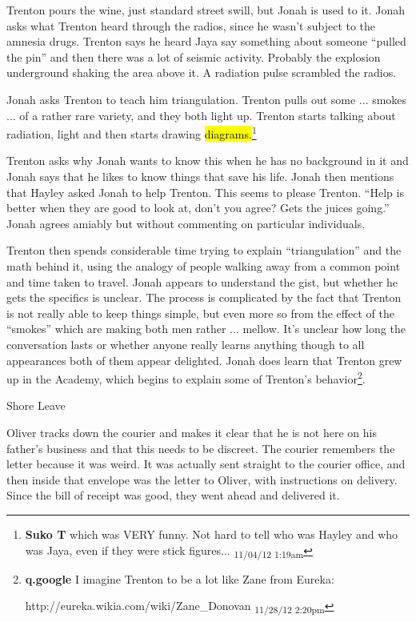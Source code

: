 Trenton pours the wine, just standard street swill, but Jonah is used to it.  Jonah asks what Trenton heard through the radios, since he wasn't subject to the amnesia drugs.  Trenton says he heard Jaya say something about someone ``pulled the pin'' and then there was a lot of seismic activity. Probably the explosion underground shaking the area above it.  A radiation pulse scrambled the radios.



Jonah asks Trenton to teach him triangulation. Trenton pulls out some ... smokes ... of a rather rare variety, and they both light up.  Trenton starts talking about radiation, light and then starts drawing \hl{diagrams.}\footnote{\textbf{Suko T }which was VERY funny.  Not hard to tell who was Hayley and who was Jaya, even if they were stick figures... \textsubscript{11/04/12 1:19am}}



Trenton asks why Jonah wants to know this when he has no background in it and Jonah says that he likes to know things that save his life.  Jonah then mentions that Hayley asked Jonah to help Trenton.  This seems to please Trenton.  ``Help is better when they are good to look at, don't you agree?  Gets the juices going.''  Jonah agrees amiably but without commenting on particular individuals.



Trenton then spends considerable time trying to explain ``triangulation'' and the math behind it, using the analogy of people walking away from a common point and time taken to travel.  Jonah appears to understand the gist, but whether he gets the specifics is unclear.  The process is complicated by the fact that Trenton is not really able to keep things simple, but even more so from the effect of the ``smokes'' which are making both men rather ... mellow.  It's unclear how long the conversation lasts or whether anyone really learns anything though to all appearances both of them appear delighted.  Jonah does learn that Trenton grew up in the Academy, which begins to explain some of Trenton's behavior\footnote{\textbf{q.google }I imagine Trenton to be a lot like Zane from Eureka:

http://eureka.wikia.com/wiki/Zane\_Donovan \textsubscript{11/28/12 2:20pm}}.



 {\LARGE Shore Leave } 



Oliver tracks down the courier and makes it clear that he is not here on his father's business and that this needs to be discreet.  The courier remembers the letter because it was weird. It was actually sent straight to the courier office, and then inside that envelope was the letter to Oliver, with instructions on delivery.  Since the bill of receipt was good, they went ahead and delivered it.



